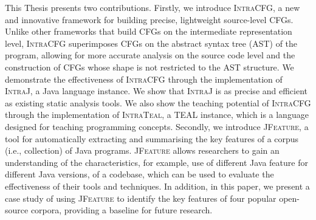 This Thesis presents two contributions.
Firstly, we introduce \textsc{IntraCFG}, a new and innovative framework for building
precise, lightweight source-level CFGs. Unlike other frameworks that 
build CFGs on the intermediate representation level, \textsc{IntraCFG} superimposes 
CFGs on the abstract syntax tree (AST) of the program, allowing for more accurate 
analysis on the source code level and the construction of CFGs whose shape is not 
restricted to the AST structure. We demonstrate the effectiveness
of \textsc{IntraCFG} through the implementation of \textsc{IntraJ}, a Java language
instance. We show that \textsc{IntraJ} is as precise and efficient as existing 
static analysis tools. We also show the teaching potential of \textsc{IntraCFG} 
through the implementation of \textsc{IntraTeal}, a TEAL instance, which
is a language designed for teaching programming concepts.
Secondly, we introduce \textsc{JFeature}, a tool for automatically extracting and summarising
the key features of a corpus (i.e., collection) of Java programs. \textsc{JFeature}
allows researchers to gain an understanding of the characteristics, for example,
use of different Java feature for different Java versions, of a codebase,
which can be used to evaluate the effectiveness of their tools and techniques.
In addition, in this paper, we present a case study of using \textsc{JFeature} to
identify the key features of four popular open-source corpora, providing a
baseline for future research.








